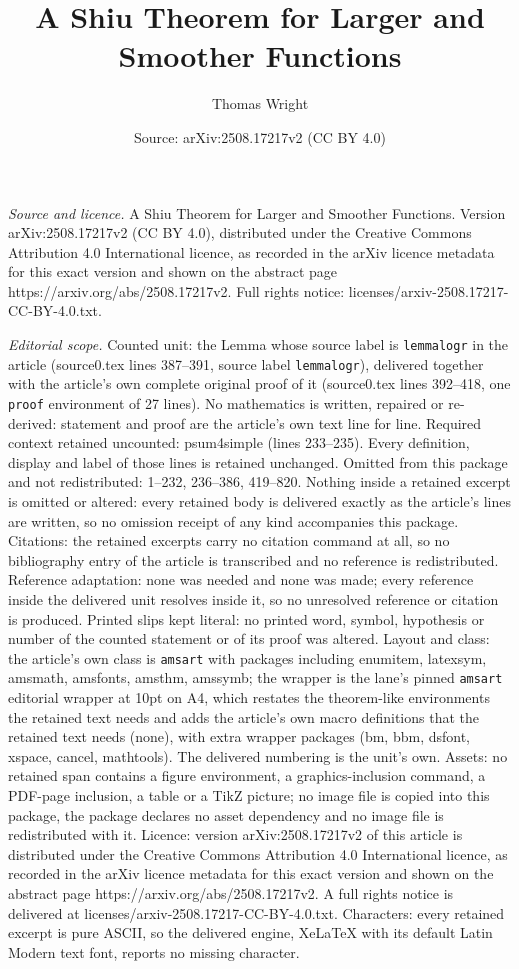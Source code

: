 \documentclass[10pt,a4paper]{amsart}
\title[A Shiu Theorem for Larger and Smoother Functions]{A Shiu Theorem for Larger and Smoother Functions}
\author{Thomas Wright}
\date{Source: arXiv:2508.17217v2 (CC BY 4.0)}
\begin{document}
\maketitle

\noindent\emph{Source and licence.} A Shiu Theorem for Larger and Smoother Functions. Version arXiv:2508.17217v2 (CC BY 4.0), distributed under the Creative Commons Attribution 4.0 International licence, as recorded in the arXiv licence metadata for this exact version and shown on the abstract page https://arxiv.org/abs/2508.17217v2. Full rights notice: licenses/arxiv-2508.17217-CC-BY-4.0.txt.\par\smallskip

\noindent\textit{Editorial scope.} Counted unit: the Lemma whose source label is \texttt{lemmalogr} in the article (source0.tex lines 387--391, source label \texttt{lemmalogr}), delivered together with the article's own complete original proof of it (source0.tex lines 392--418, one \texttt{proof} environment of 27 lines). No mathematics is written, repaired or re-derived: statement and proof are the article's own text line for line. Required context retained uncounted: psum4simple (lines 233--235). Every definition, display and label of those lines is retained unchanged. Omitted from this package and not redistributed: 1--232, 236--386, 419--820. Nothing inside a retained excerpt is omitted or altered: every retained body is delivered exactly as the article's lines are written, so no omission receipt of any kind accompanies this package. Citations: the retained excerpts carry no citation command at all, so no bibliography entry of the article is transcribed and no reference is redistributed. Reference adaptation: none was needed and none was made; every reference inside the delivered unit resolves inside it, so no unresolved reference or citation is produced. Printed slips kept literal: no printed word, symbol, hypothesis or number of the counted statement or of its proof was altered. Layout and class: the article's own class is \texttt{amsart} with packages including enumitem, latexsym, amsmath, amsfonts, amsthm, amssymb; the wrapper is the lane's pinned \texttt{amsart} editorial wrapper at 10pt on A4, which restates the theorem-like environments the retained text needs and adds the article's own macro definitions that the retained text needs (none), with extra wrapper packages (bm, bbm, dsfont, xspace, cancel, mathtools). The delivered numbering is the unit's own. Assets: no retained span contains a figure environment, a graphics-inclusion command, a PDF-page inclusion, a table or a TikZ picture; no image file is copied into this package, the package declares no asset dependency and no image file is redistributed with it. Licence: version arXiv:2508.17217v2 of this article is distributed under the Creative Commons Attribution 4.0 International licence, as recorded in the arXiv licence metadata for this exact version and shown on the abstract page https://arxiv.org/abs/2508.17217v2. A full rights notice is delivered at licenses/arxiv-2508.17217-CC-BY-4.0.txt. Characters: every retained excerpt is pure ASCII, so the delivered engine, XeLaTeX with its default Latin Modern text font, reports no missing character.
\end{document}
